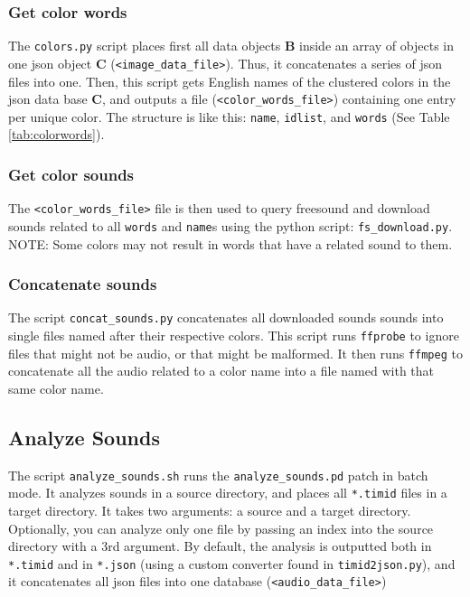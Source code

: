 \subsubsection{Get color words}

The \texttt{colors.py} script places first all data objects \textbf{B} inside an array of objects in one \gls{json} object \textbf{C} (\texttt{<image\_data\_file>}). Thus, it concatenates a series of \gls{json} files into one. Then, this script gets English names of the clustered colors in the \gls{json} data base \textbf{C}, and outputs a file (\texttt{<color\_words\_file>}) containing one entry per unique color. The structure is like this: \texttt{name}, \texttt{idlist}, and \texttt{words} (See Table \ref{tab:colorwords}).



\subsubsection{Get color sounds}

The \texttt{<color\_words\_file>} file is then used to query \gls{freesound} and download sounds related to all \texttt{words} and \texttt{name}s using the python script: \texttt{fs\_download.py}. NOTE: Some colors may not result in words that have a related sound to them.


\subsubsection{Concatenate sounds}

The script \texttt{concat\_sounds.py} concatenates all downloaded sounds sounds into single files named after their respective colors. This script runs \texttt{ffprobe} to ignore files that might not be audio, or that might be malformed. It then runs \texttt{ffmpeg} to concatenate all the audio related to a color name into a file named with that same color name.




\subsection{Analyze Sounds}



The script \texttt{analyze\_sounds.sh} runs the \texttt{analyze\_sounds.pd} patch in batch mode. It analyzes sounds in a source directory, and places all \texttt{*.timid} files in a target directory. It takes two arguments: a source and a target directory. Optionally, you can analyze only one file by passing an index into the source directory with a 3rd argument. By default, the analysis is outputted both in \texttt{*.timid} and in \texttt{*.json} (using a custom converter found in \texttt{timid2json.py}), and it concatenates all \gls{json} files into one database (\texttt{<audio\_data\_file>})


